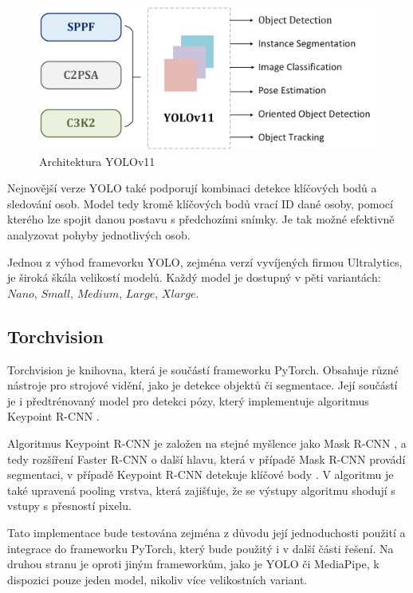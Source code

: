 \begin{figure}[]
    \centering
    \includegraphics[height=0.2\textheight]{Figures/yolo_v11.png}
    \caption{Architektura YOLOv11 \cite{yolov11}}
    \label{fig:yolov11}
\end{figure}

Nejnovější verze YOLO také podporují kombinaci detekce klíčových bodů a
sledování osob. Model tedy kromě klíčových bodů vrací ID dané osoby, pomocí
kterého lze spojit danou postavu s předchozími snímky. Je tak možné efektivně
analyzovat pohyby jednotlivých osob.

Jednou z výhod framevorku YOLO, zejména verzí vyvíjených firmou Ultralytics, je
široká škála velikostí modelů. Každý model je dostupný v pěti variantách:
$Nano$, $Small$, $Medium$, $Large$, $Xlarge$.

\subsection{Torchvision}

Torchvision je knihovna, která je součástí frameworku PyTorch. Obsahuje různé
nástroje pro strojové vidění, jako je detekce objektů či segmentace. Její
součástí je i předtrénovaný model pro detekci pózy, který implementuje
algoritmus Keypoint R-CNN \cite{keypoint-rcnn}.

Algoritmus Keypoint R-CNN je založen na stejné myšlence jako Mask R-CNN
\cite{mask-r-cnn}, a tedy rozšíření Faster R-CNN o další hlavu, která v případě
Mask R-CNN provádí segmentaci, v případě Keypoint R-CNN detekuje klíčové body \cite{keypoint-rcnn}.
V algoritmu je také upravená pooling vrstva, která zajišťuje, že se výstupy
algoritmu shodují s vstupy s přesností pixelu.

Tato implementace bude testována zejména z důvodu její jednoduchosti použití a
integrace do frameworku PyTorch, který bude použitý i v další části řešení.
Na druhou stranu je oproti jiným frameworkům, jako je YOLO či MediaPipe, k
dispozici pouze jeden model, nikoliv více velikostních variant.

